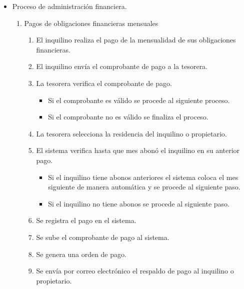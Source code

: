 \begin{itemize}
    \item Proceso de administración financiera.
    \begin{enumerate}
        \item Pagos de obligaciones financieras mensuales
        \begin{enumerate}
            \item El inquilino realiza el pago de la mensualidad de sus obligaciones financieras.
            \item El inquilino envía el comprobante de pago a la tesorera.
            \item La tesorera verifica el comprobante de pago.
            \begin{itemize}
                \item Si el comprobante es válido se procede al siguiente proceso.
                \item Si el comprobante no es válido se finaliza el proceso.
            \end{itemize}
            \item La tesorera selecciona la residencia del inquilino o propietario.
            \item El sistema verifica hasta que mes abonó el inquilino en su anterior pago.
            \begin{itemize}
                \item Si el inquilino tiene abonos anteriores el sistema coloca el mes siguiente de manera automática y se procede al siguiente paso.
                \item Si el inquilino no tiene abonos se procede al siguiente paso.
            \end{itemize}
            \item Se registra el pago en el sistema.
            \item Se sube el comprobante de pago al sistema.
            \item Se genera una orden de pago.
            \item Se envía por correo electrónico el respaldo de pago al inquilino o propietario.
        \end{enumerate}


\end{enumerate}
\end{itemize}
